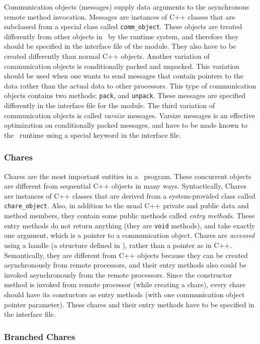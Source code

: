Communication objects (messages) supply data arguments to the
asynchronous remote method invocation. Messages are instances of C++ classes
that are subclassed from a special class called {\tt comm\_object}.
These objects are treated differently from other objects in \charmpp\
by the runtime system, and therefore they should be specified in the
interface file of the module. They also have to be created differently
than normal C++ objects. Another variation of communication objects
is conditionally packed and unpacked. This variation should be used when
one wants to send messages that contain pointers to the data rather than
the actual data to other processors. This type of communication objects
contains two methods: {\tt pack}, and {\tt unpack}. 
These messages are specified differently in the interface file for the module.
The third variation of communication objects is called {\em varsize} messages. 
Varsize messages is an effective optimization on conditionally packed messages,
and have to be made known to the \charmpp\ runtime using a special keyword in
the interface file.

\subsubsection{Chares}

Chares are the most important entities in a \charmpp\ program. These 
concurrent objects are different from sequential C++ objects in many
ways. Syntactically, Chares are instances of C++ classes that are derived
from a system-provided class called {\tt chare\_object}. Also, in addition
to the usual C++ private and public data and method members, they contain
some public methods called {\em entry methods}. These entry methods do not
return anything (they are {\tt void} methods), and take exactly one argument,
which is a pointer to a communication object. Chares are {\em accessed} using
a handle (a structure defined in \charmpp), rather than a pointer as in C++.
Semantically, they are different
from C++ objects because they can be created asynchronously from remote
processors, and their entry methods also could be invoked asynchronously
from the remote processors. Since the constructor method is invoked
from remote processor (while creating a chare), every chare should have
its constuctors as entry methods (with one communication object pointer
parameter). These chares and their entry methods have to be specified
in the interface file.

\subsubsection{Branched Chares}

